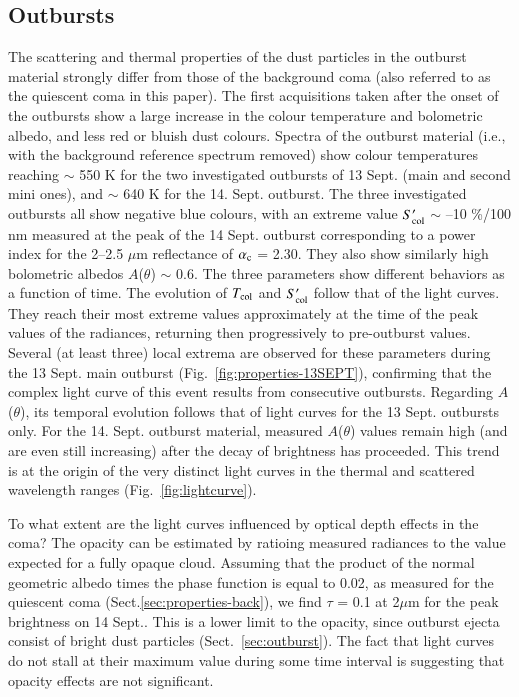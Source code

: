 \documentclass[a4paper,fleqn,usenatbib]{mnras}
\begin{document}
\subsection{Outbursts}
The scattering and thermal properties of the dust particles in the
outburst material strongly differ from those of the background
coma (also referred to as the quiescent coma in this paper).  The first acquisitions taken after the onset of the
outbursts show a large increase in the colour temperature and bolometric albedo, and less red or bluish dust colours. Spectra of the outburst material (i.e., with
the background reference spectrum removed) show colour temperatures reaching $\sim$ 550 K for the
two investigated outbursts of 13 Sept. (main and second mini ones), and $\sim$ 640 K for the 14. Sept. outburst. The three investigated outbursts all show negative blue colours, with an extreme value
$S'_{\rm col}$ $\sim$ --10 \%/100 nm measured at the peak of the 14 Sept. outburst corresponding to a power index for the 2--2.5 $\mu$m reflectance of $\alpha_{\rm c}$ = 2.30. They also show similarly high bolometric albedos
$A$($\theta$) $\sim$ 0.6. The three parameters show different behaviors as a function of time. The evolution of $T_{\rm col}$ and $S'_{\rm col}$ follow that of the light curves. They reach their most extreme values approximately at the time of the peak values of the radiances, returning then progressively to pre-outburst values. Several (at least three) local extrema are observed for these parameters during the 13 Sept. main outburst (Fig.~\ref{fig:properties-13SEPT}), confirming that the complex light curve of this event results from consecutive outbursts.
Regarding $A$($\theta$), its temporal evolution follows that of light curves for the 13 Sept. outbursts only. For the 14. Sept. outburst material, measured $A$($\theta$) values remain high (and are even still increasing) after the decay of brightness has proceeded. This trend is at the origin of the very distinct light curves in the thermal and scattered wavelength ranges (Fig.~\ref{fig:lightcurve}).

To what extent are the light curves influenced by optical depth effects in the coma? 
The opacity can be estimated by ratioing measured radiances to the value expected for a fully opaque cloud. Assuming that the product of the normal geometric albedo times the phase function is equal to 0.02, as measured for the quiescent coma 
(Sect.\ref{sec:properties-back}), we find $\tau$ = 0.1 at 2$\mu$m
for the peak brightness on 14 Sept.. This is a lower limit to the
opacity, since outburst ejecta consist of bright dust particles (Sect.~\ref{sec:outburst}). The fact that light curves do not stall at their maximum value
during some time interval is  suggesting that opacity effects are
not significant.
\end{document}
